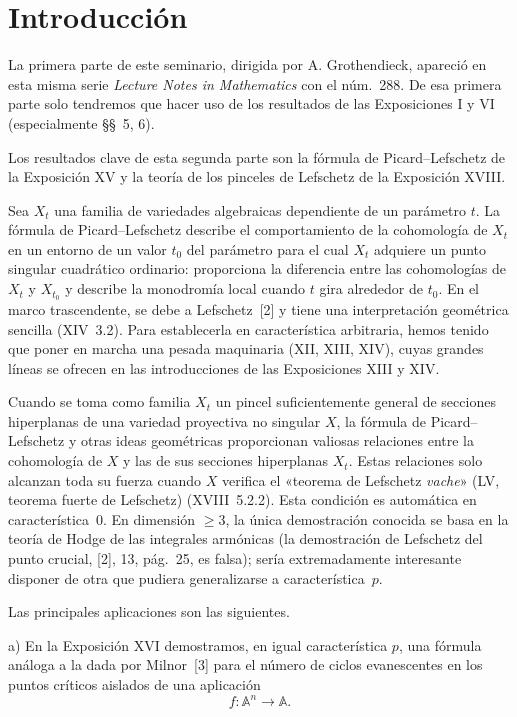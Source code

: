 \setcounter{page}{5}
\chapter*{Introducción}

La primera parte de este seminario, dirigida por A. Grothendieck, apareció en esta misma serie \emph{Lecture Notes in Mathematics} con el núm.~288. De esa primera parte solo tendremos que hacer uso de los resultados de las Exposiciones I y VI (especialmente §§~5, 6).

Los resultados clave de esta segunda parte son la fórmula de Picard--Lefschetz de la Exposición XV y la teoría de los pinceles de Lefschetz de la Exposición XVIII.

Sea $X_t$ una familia de variedades algebraicas dependiente de un parámetro $t$. La fórmula de Picard--Lefschetz describe el comportamiento de la cohomología de $X_t$ en un entorno de un valor $t_0$ del parámetro para el cual $X_t$ adquiere un punto singular cuadrático ordinario: proporciona la diferencia entre las cohomologías de $X_t$ y $X_{t_0}$ y describe la monodromía local cuando $t$ gira alrededor de $t_0$. En el marco trascendente, se debe a Lefschetz~[2] y tiene una interpretación geométrica sencilla (XIV~3.2). Para establecerla en característica arbitraria, hemos tenido que poner en marcha una pesada maquinaria (XII, XIII, XIV), cuyas grandes líneas se ofrecen en las introducciones de las Exposiciones XIII y XIV.

Cuando se toma como familia $X_t$ un pincel suficientemente general de secciones hiperplanas de una variedad proyectiva no singular $X$, la fórmula de Picard--Lefschetz y otras ideas geométricas proporcionan valiosas relaciones entre la cohomología de $X$ y las de sus secciones hiperplanas $X_t$. Estas relaciones solo alcanzan toda su fuerza cuando $X$ verifica el «teorema de Lefschetz \emph{vache}» (LV, teorema fuerte de Lefschetz) (XVIII~5.2.2). Esta condición es automática en característica~0. En dimensión $\geq 3$, la única demostración conocida se basa en la teoría de Hodge de las integrales armónicas (la demostración de Lefschetz del punto crucial, [2], 13, pág.~25, es falsa); sería extremadamente interesante disponer de otra que pudiera generalizarse a característica~$p$.

\clearpage

Las principales aplicaciones son las siguientes.

\medskip
\noindent\textup{a)} En la Exposición XVI demostramos, en igual característica $p$, una fórmula análoga a la dada por Milnor~[3] para el número de ciclos evanescentes en los puntos críticos aislados de una aplicación
\[
f:\mathbb{A}^{n}\longrightarrow\mathbb{A}.
\]


